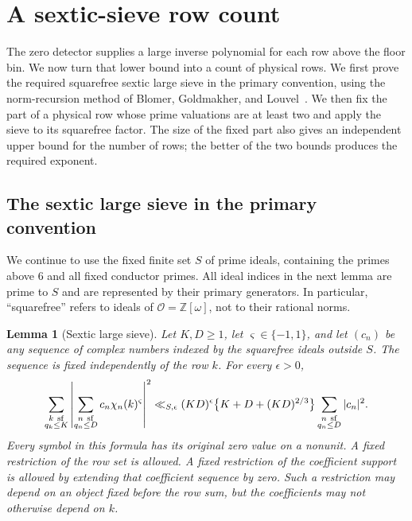 \documentclass[11pt,a4paper]{article}
\numberwithin{equation}{section}
\numberwithin{figure}{section}
\newtheorem{lemma}[theorem]{Lemma}
\theoremstyle{definition}
\theoremstyle{remark}
\begin{document}
\section{A sextic-sieve row count}\label{sec:sextic-row-count}

The zero detector supplies a large inverse polynomial for each row above
the floor bin.  We now turn that lower bound into a count of physical rows.
We first prove the required squarefree sextic large sieve in the primary
convention, using the norm-recursion method of Blomer, Goldmakher, and
Louvel~\cite[Section 3]{BGL}. We then fix the part of a physical row whose
prime valuations are at least two and apply the sieve to its squarefree
factor. The size of the fixed part also gives an independent upper bound
for the number of rows; the better of the two bounds produces the required
exponent.

\subsection{The sextic large sieve in the primary convention}

We continue to use the fixed finite set $S$ of prime ideals, containing
the primes above $6$ and all fixed conductor primes.  All ideal indices in
the next lemma are prime to $S$ and are represented by their primary
generators.  In particular, ``squarefree'' refers to ideals of
$\mathcal O=\mathbb Z[\omega]$, not to their rational norms.

\begin{lemma}[Sextic large sieve]\label{lem:sextic-large-sieve}
Let $K,D\ge1$, let $\varsigma\in\{-1,1\}$, and let $(c_n)$ be any
sequence of complex numbers indexed by the squarefree ideals outside $S$.
The sequence is fixed independently of the row $k$.  For every
$\epsilon>0$,
\begin{equation}\label{eq:sextic-large-sieve}
 \sum_{\substack{k\ {\rm sf}\\q_k\le K}}
 \left|\sum_{\substack{n\ {\rm sf}\\q_n\le D}}
       c_n\chi_n(k)^{\varsigma}\right|^2
 \ll_{S,\epsilon}(KD)^\epsilon
       \bigl\{K+D+(KD)^{2/3}\bigr\}
       \sum_{\substack{n\ {\rm sf}\\q_n\le D}}|c_n|^2.
\end{equation}
Every symbol in this formula has its original zero value on a nonunit.
A fixed restriction of the row set is allowed.  A fixed restriction of
the coefficient support is allowed by extending that coefficient sequence
by zero.  Such a restriction may depend on an object fixed before the row
sum, but the coefficients may not otherwise depend on $k$.
\end{lemma}
\end{document}

